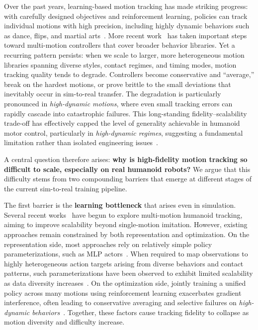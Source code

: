Over the past years, learning-based motion tracking has made striking progress: with carefully designed objectives and reinforcement learning, policies can track individual motions with high precision, including highly dynamic behaviors such as dance, flips, and martial arts~\cite{zhang2025hub,liao2025beyondmimic,he2025asap}. More recent work~\cite{chen2025gmt,luo2025sonic,fu2024humanplus,ji2024exbody2,he2024omnih2o,cheng2024expressive,he2024learning,zhang2025track,ze2025twist,li2025clone} has taken important steps toward multi-motion controllers that cover broader behavior libraries. Yet a recurring pattern persists: when we scale to larger, more heterogeneous motion libraries spanning diverse styles, contact regimes, and timing modes, motion tracking quality tends to degrade. Controllers become conservative and ``average,'' break on the hardest motions, or prove brittle to the small deviations that inevitably occur in sim-to-real transfer. The degradation is particularly pronounced in \emph{high-dynamic motions},
where even small tracking errors can rapidly cascade into catastrophic failures.
This long-standing fidelity--scalability trade-off has effectively capped the
level of generality achievable in humanoid motor control, particularly in
\emph{high-dynamic regimes}, suggesting a fundamental limitation rather than
isolated engineering issues~\cite{he2024omnih2o,zhang2025track,he2025asap,zhang2025hub}.



A central question therefore arises: \textbf{why is high-fidelity motion tracking so difficult to scale, especially on real humanoid robots?}
We argue that this difficulty stems from two compounding barriers that emerge at different stages of the current sim-to-real training pipeline.

The first barrier is the \textbf{learning bottleneck} that arises even in simulation. Several recent works~\cite{zhang2025track,chen2025gmt,ji2024exbody2,luo2025sonic,ze2025twist,li2025clone,he2024learning,he2024omnih2o} have begun to explore multi-motion humanoid tracking, aiming to improve scalability beyond single-motion imitation. However, existing approaches remain constrained by both representation and optimization. On the representation side, most approaches rely on relatively simple policy parameterizations, such as MLP actors~\cite{zhang2025track,chen2025gmt,ji2024exbody2,ze2025twist,li2025clone,he2024learning,he2024omnih2o,wang2025experts}. When required to map observations to highly heterogeneous action targets arising from
diverse behaviors and contact patterns, such parameterizations have been observed to
exhibit limited scalability as data diversity increases~\cite{pan2025much}. On the optimization side, jointly training a unified policy across many motions using reinforcement learning exacerbates gradient interference, often leading to conservative averaging and selective failures on \emph{high-dynamic behaviors}~\cite{he2024learning,he2024omnih2o,fu2024humanplus,luo2025sonic}. Together, these factors cause tracking fidelity to collapse as motion diversity and difficulty increase.

